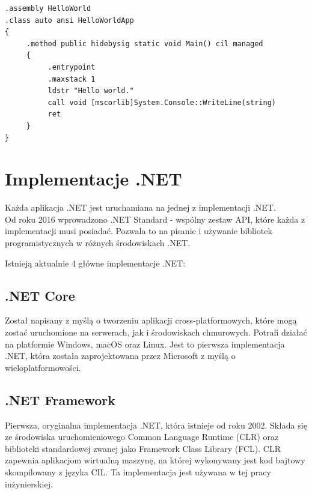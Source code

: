 \begin{minipage}{\linewidth}
\begin{lstlisting}[frame=single, numbers=none,captionpos=b, 
caption={Przykładowy kod aplikacji ''Hello World'' w języku CIL}]
.assembly HelloWorld
.class auto ansi HelloWorldApp
{
     .method public hidebysig static void Main() cil managed
     {
          .entrypoint
          .maxstack 1
          ldstr "Hello world."
          call void [mscorlib]System.Console::WriteLine(string)
          ret
     }
}
\end{lstlisting}
\end{minipage}


\section{Implementacje .NET}

Każda aplikacja .NET jest uruchamiana na jednej z implementacji .NET. \\
Od roku 2016 wprowadzono .NET Standard - wspólny zestaw API, które każda z implementacji musi posiadać. Pozwala to na pisanie i używanie bibliotek programistycznych w różnych środowiskach .NET. 

Istnieją aktualnie 4 główne implementacje .NET:

\subsection{.NET Core}
Został napisany z myślą o tworzeniu aplikacji cross-platformowych, które mogą zostać uruchomione na serwerach, jak i środowiskach chmurowych. Potrafi działać na platformie Windows, macOS oraz Linux. Jest to pierwsza implementacja .NET, która została zaprojektowana przez Microsoft z myślą o wieloplatformowości.

\subsection{.NET Framework}
Pierwsza, oryginalna implementacja .NET, która istnieje od roku 2002. Składa się ze środowiska uruchomieniowego Common Language Runtime (CLR) oraz biblioteki standardowej zwanej jako Framework Class Library (FCL). CLR zapewnia aplikacjom wirtualną maszynę, na której wykonywany jest kod bajtowy skompilowany z języka CIL. Ta implementacja jest używana w tej pracy inżynierskiej.

